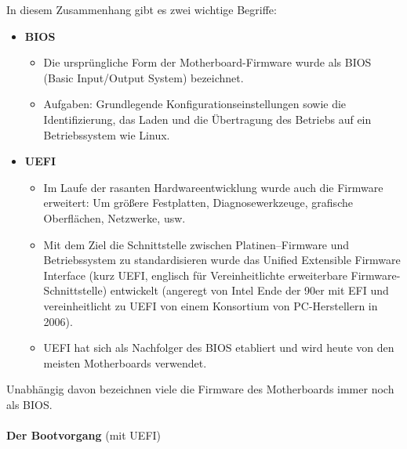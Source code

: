 In diesem Zusammenhang gibt es zwei wichtige Begriffe:
\begin{itemize}
	\item \textbf{BIOS}
\begin{itemize}
	\item Die ursprüngliche Form der Motherboard-Firmware wurde als BIOS (Basic Input/Output System) bezeichnet.
	\item Aufgaben: Grundlegende Konfigurationseinstellungen sowie die Identifizierung, das Laden und die Übertragung des Betriebs auf ein Betriebssystem wie Linux.
\end{itemize}
\item \textbf{UEFI}
\begin{itemize}
	\item Im Laufe der rasanten Hardwareentwicklung wurde auch die Firmware erweitert: Um größere Festplatten, Diagnosewerkzeuge, grafische Oberflächen, Netzwerke, usw.
	\item Mit dem Ziel die Schnittstelle zwischen Platinen--Firmware und Betriebssystem zu standardisieren wurde das Unified Extensible Firmware Interface (kurz UEFI, englisch für Vereinheitlichte erweiterbare Firmware-Schnittstelle) entwickelt (angeregt von Intel Ende der 90er mit EFI und vereinheitlicht zu UEFI von einem Konsortium von PC-Herstellern in 2006).
	\item UEFI hat sich als Nachfolger des BIOS etabliert und wird heute von den meisten Motherboards verwendet.
\end{itemize}
\end{itemize}
Unabhängig davon bezeichnen viele die Firmware des Motherboards immer noch als BIOS.
~\\~\\
\textbf{Der Bootvorgang} (mit UEFI)
